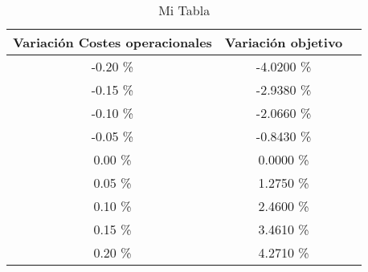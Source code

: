 \begin{table}
\centering
\begin{tabular}{|c|c|c|}
\hline
 Variación Costes operacionales & Variación objetivo \\ \hline
-0.20 \% & -4.0200 \% \\ \hline
-0.15 \% & -2.9380 \% \\ \hline
-0.10 \% & -2.0660 \% \\ \hline
-0.05 \% & -0.8430 \% \\ \hline
0.00 \% & 0.0000 \% \\ \hline
0.05 \% & 1.2750 \% \\ \hline
0.10 \% & 2.4600 \% \\ \hline
0.15 \% & 3.4610 \% \\ \hline
0.20 \% & 4.2710 \% \\ \hline
\end{tabular}
\caption{Mi Tabla}
\end{table}
